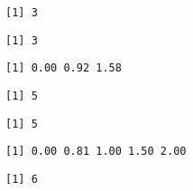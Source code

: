 \documentclass[
  letterpaper,
]{article}
\begin{document}
\begin{figure}

\begin{minipage}{0.15\linewidth}

\begin{verbatim}
[1] 3
\end{verbatim}

\end{minipage}%
%
\begin{minipage}{0.15\linewidth}

\begin{verbatim}
[1] 3
\end{verbatim}

\end{minipage}%
%
\begin{minipage}{0.70\linewidth}

\begin{verbatim}
[1] 0.00 0.92 1.58
\end{verbatim}

\end{minipage}%
\newline
\begin{minipage}{0.15\linewidth}

\begin{verbatim}
[1] 5
\end{verbatim}

\end{minipage}%
%
\begin{minipage}{0.15\linewidth}

\begin{verbatim}
[1] 5
\end{verbatim}

\end{minipage}%
%
\begin{minipage}{0.70\linewidth}

\begin{verbatim}
[1] 0.00 0.81 1.00 1.50 2.00
\end{verbatim}

\end{minipage}%
\newline
\begin{minipage}{0.15\linewidth}

\begin{verbatim}
[1] 6
\end{verbatim}

\end{minipage}%
%
\begin{minipage}{0.15\linewidth}


\end{minipage}
\end{figure}
\end{document}
